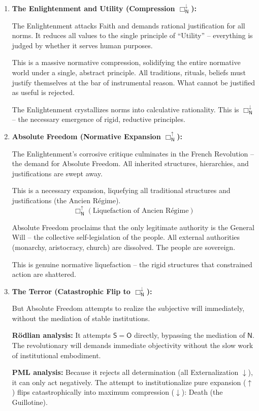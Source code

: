 \documentclass[12pt]{book}
\newcommand{\NBoxUp}{\Box_{\mathsf{N}}^{\uparrow}}
\newcommand{\NBoxDown}{\Box_{\mathsf{N}}^{\downarrow}}
\begin{document}
\begin{enumerate}
\item \textbf{The Enlightenment and Utility (Compression $\NBoxDown$):}

The Enlightenment attacks Faith and demands rational justification for all norms. It reduces all values to the single principle of ``Utility'' -- everything is judged by whether it serves human purposes.

This is a massive normative compression, solidifying the entire normative world under a single, abstract principle. All traditions, rituals, beliefs must justify themselves at the bar of instrumental reason. What cannot be justified as useful is rejected.

The Enlightenment crystallizes norms into calculative rationality. This is $\NBoxDown$ -- the necessary emergence of rigid, reductive principles.

\item \textbf{Absolute Freedom (Normative Expansion $\NBoxUp$):}

The Enlightenment's corrosive critique culminates in the French Revolution -- the demand for Absolute Freedom. All inherited structures, hierarchies, and justifications are swept away.

This is a necessary expansion, liquefying all traditional structures and justifications (the Ancien Régime).
\[
\NBoxUp(\text{Liquefaction of Ancien Régime})
\]

Absolute Freedom proclaims that the only legitimate authority is the General Will -- the collective self-legislation of the people. All external authorities (monarchy, aristocracy, church) are dissolved. The people are sovereign.

This is genuine normative liquefaction -- the rigid structures that constrained action are shattered.

\item \textbf{The Terror (Catastrophic Flip to $\NBoxDown$):}

But Absolute Freedom attempts to realize the subjective will immediately, without the mediation of stable institutions.

\textbf{Rödlian analysis:} It attempts $\mathsf{S}=\mathsf{O}$ directly, bypassing the mediation of $\mathsf{N}$. The revolutionary will demands immediate objectivity without the slow work of institutional embodiment.

\textbf{PML analysis:} Because it rejects all determination (all Externalization $\downarrow$), it can only act negatively. The attempt to institutionalize pure expansion ($\uparrow$) flips catastrophically into maximum compression ($\downarrow$): Death (the Guillotine).


\end{enumerate}
\end{document}
